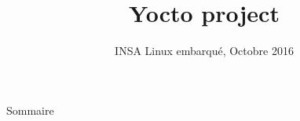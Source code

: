 \documentclass{beamer}
\title[Yocto project]
{Yocto project}
\date[Octobre 2016]
{INSA Linux embarqué, Octobre 2016}
\begin{document}
\begin{frame}
  \titlepage
\end{frame}

\begin{frame}{Sommaire}
  \tableofcontents
\end{frame}










\end{document}
